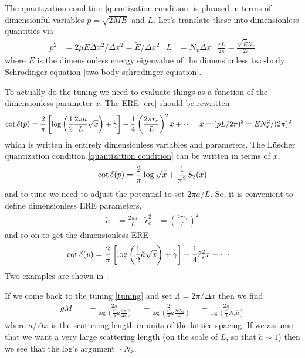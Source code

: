 The quantization condition \eqref{quantization condition} is phrased in terms of dimensionful variables $p=\sqrt{2ME}$ and $L$.
Let's translate these into dimensionless quantities via
\begin{align}
    p^2 &= 2 \mu  E \Delta x^2 / \Delta x^2 = \tilde{E} / \Delta x^2
	&
	L &= N_x \Delta x
    &
    \frac{pL}{2\pi} = \frac{\sqrt{\tilde{E}} N_x}{2\pi}
\end{align}
where $\tilde{E}$ is the dimensionless energy eigenvalue of the dimensionless two-body Schr\"{o}dinger equation \eqref{two-body schrodinger equation}.

To actually do the tuning we need to evaluate things as a function of the dimensionless parameter $x$.
The ERE \eqref{ere} should be rewritten
\begin{align}
    \cot \delta(p)
    &=
    \frac{2}{\pi}\left[ \log\left(\frac{1}{2} \frac{2\pi a}{L} \sqrt{x}\right)+ \gamma\right]
    +
    \frac{1}{4} \left(\frac{2\pi r_e }{L}\right)^2 x
    +
    \cdots
	&
	x&=(pL/2\pi)^2=\tilde{E}N_x^2 / (2\pi)^2
    \label{eq:ere dimensionless}
\end{align}
which is written in entirely dimensionless variables and parameters.
The L\"{u}scher quantization condition \eqref{quantization condition} can be written in terms of $x$,
\begin{align}
    \cot \delta(p) = \frac{2}{\pi} \log \sqrt{x} + \frac{1}{\pi^2} S_2(x)
	\label{eq:quantization condition dimensionless}
\end{align}
and to tune we need to adjust the potential to set $2\pi a/L$.
So, it is convenient to define dimensionless ERE parameters,
\begin{align}
    \tilde{a} &= \frac{2 \pi a}{L}
    &
    \tilde{r}_e^2 &= \left(\frac{2 \pi r_e}{L}\right)^2
	\label{eq:dimensionless ere parameters}
\end{align}
and so on to get the dimensionless ERE
\begin{align}
    \cot \delta(p)
    &=
	\frac{2}{\pi}\left[ \log\left(\frac{1}{2} \tilde{a} \sqrt{x}\right)+ \gamma\right]
    +
	\frac{1}{4} \tilde{r}_e^2 x
    +
    \cdots
    \label{eq:ere dimensionless}
\end{align}
Two examples are shown in .

If we come back to the tuning \eqref{tuning} and set $\Lambda=2\pi/\Delta x$ then we find
\begin{align}
	gM
	&= - \frac{2\pi}{\log\left(\frac{e^\gamma}{2} a \frac{2\pi}{\Delta x}\right)}
	= - \frac{2\pi}{\log\left(\frac{e^\gamma}{2} a \frac{2\pi N_x}{L}\right)}
	= - \frac{2\pi}{\log\left(\frac{e^\gamma}{2} N_x \tilde{a} \right)}
	\label{eq:coupling analytically}
\end{align}
where $a/\Delta x$ is the scattering length in units of the lattice spacing.
If we assume that we want a very large scattering length (on the scale of $L$, so that $\tilde{a} \sim 1$) then we see that the log's argument $\sim N_x$.

